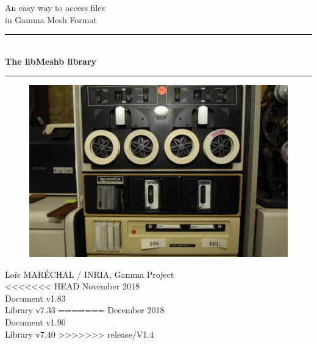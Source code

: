 \documentclass[a4paper,12pt]{article}
\newcommand{\HRule}{\rule{\linewidth}{1mm}}
\begin{document}
%
%

\begin{titlepage}

\begin{center}
\huge An easy way to access files\\ in Gamma Mesh Format
\HRule \\
\medskip
{\Huge \bfseries The libMeshb library} \\
\HRule
\end{center}

\vfill

\begin{figure}[htbp]
\begin{center}
\includegraphics[width=14cm]{tape.jpeg}
\end{center}
\end{figure}

\vfill

\begin{flushright}
\Large Lo\"ic MAR\'ECHAL / INRIA, Gamma Project\\
<<<<<<< HEAD
\Large November 2018 \\
\normalsize Document v1.83 \\
\normalsize Library v7.33
=======
\Large December 2018 \\
\normalsize Document v1.90 \\
\normalsize Library v7.40
>>>>>>> release/V1.4
\end{flushright}

\end{titlepage}

\clearpage

\setcounter{tocdepth}{2}
\tableofcontents
\vfill
\end{document}
